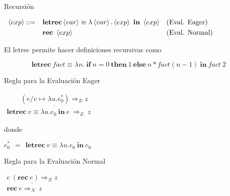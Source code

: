 \documentclass[handout]{beamer}
\newcommand{\letrecin}[2]{\textbf{letrec}\ #1\ \textbf{in}\ #2\ }
\newcommand{\var}{\left\langle var\right\rangle}
\newcommand{\ex}{\left\langle exp\right\rangle}
\begin{document}
\begin{frame}{Recursión} 

\bigskip

$
\begin{array}{llll}
\ex  ::= & \textbf{letrec}\var \equiv \lambda \var.\ex\ \textbf{in}\ \ex&\text{(Eval. Eager)}\smallskip\\
&    \textbf{rec}\ \ex& \text{(Eval. Normal)}
\end{array}
$

\bigskip

\bigskip


El letrec permite hacer definiciones recursivas como

\[\letrecin{\textit{fact} \equiv \lambda n.\ \textbf{if} \  n = 0\ \textbf{then}\ 1\ \textbf{else}\ n * \textit{fact} (n-1)}{\textit{fact}\  2} \]

\end{frame}


\begin{frame}{Regla para la Evaluación Eager}


\bigskip

\bigskip

\qquad\qquad$\begin{array}{c}
\underline{\qquad (e/v\mapsto \lambda u.e_0^*)
     \Rightarrow_E z\qquad }\\
 \letrecin{v \equiv \lambda u.e_0}{e} \Rightarrow_E\ z
\end{array}$


\bigskip

donde

\bigskip

\qquad\qquad\qquad$e_0^*\ \  = \  \ \letrecin{v \equiv \lambda u.e_0}{e_0}$



\end{frame}



\begin{frame}{Regla para la Evaluación Normal}


\bigskip

\bigskip

\qquad\qquad\qquad$\begin{array}{c}
\underline{ e\ (\textbf{rec}\ e) \Rightarrow_N z }\\
 \textbf{rec}\ e\Rightarrow_N\ z
\end{array}$

\end{frame}
\end{document}
